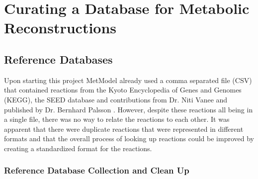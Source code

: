 
\chapter{Curating a Database for Metabolic Reconstructions} %

\label{Chapter2} %

\section{Reference Databases}

\indent\indent Upon starting this project MetModel already used a comma separated file (CSV) that contained reactions from the Kyoto Encyclopedia of Genes and Genomes (KEGG), the SEED database and contributions from Dr. Niti Vanee and published by Dr. Bernhard Palsson \citep{ogata_kegg:_1999, overbeek_seed:_2004, vanee_genome_2009, shlomi_network-based_2008}. However, despite these reactions all being in a single file, there was no way to relate the reactions to each other.  It was apparent that there were duplicate reactions that were represented in different formats and that the overall process of looking up reactions could be improved by creating a standardized format for the reactions. \clearpage

\subsection{Reference Database Collection and Clean Up}

